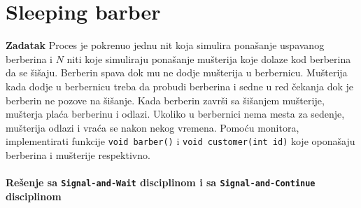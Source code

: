 \clearpage
\section{\latin Sleeping barber}
\textbf{\large Zadatak} Proces je pokrenuo jednu nit koja simulira pona\v{s}anje uspavanog berberina i $N$ niti koje simuliraju pona\v{s}anje mu\v{s}terija koje dolaze kod berberina da se \v{s}i\v{s}aju. Berberin spava dok mu ne dodje mu\v{s}terija u berbernicu. Mu\v{s}terija kada dodje u berbernicu treba da probudi berberina i sedne u red \v{c}ekanja dok je berberin ne pozove na \v{s}i\v{s}anje. Kada berberin zavr\v{s}i sa \v{s}i\v{s}anjem mu\v{s}terije, mu\v{s}terja pla\'{c}a berberinu i odlazi. Ukoliko u berbernici nema mesta za sedenje, mu\v{s}terija odlazi i vra\'{c}a se nakon nekog vremena. Pomo\'{c}u monitora, implementirati funkcije \texttt{void barber()} i \texttt{void customer(int id)} koje opona\v{s}aju berberina i mu\v{s}terije respektivno.
\\\\
\textbf{Re\v{s}enje sa \texttt{Signal-and-Wait} disciplinom i sa \texttt{Signal-and-Continue} disciplinom}
